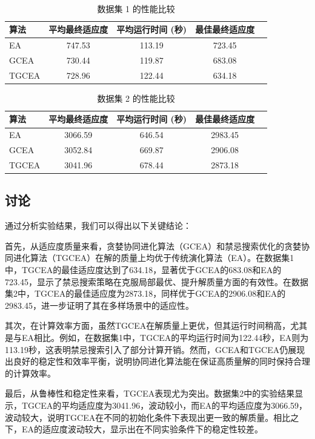 \documentclass[12pt,a4paper,oneside]{ctexart}
\begin{document}
	\newpage\
	\begin{table}[h!]
		\centering
		\caption{数据集 1 的性能比较}
		\begin{tabular}{lcccc}
			\toprule
			\textbf{算法} & \textbf{平均最终适应度} & \textbf{平均运行时间 (秒)} & \textbf{最佳最终适应度} \\
			\midrule
			EA    & 747.53 & 113.19 & 723.45 \\
			GCEA  & 730.44 & 119.87 & 683.08 \\
			TGCEA & 728.96 & 122.44 & 634.18 \\
			\bottomrule
		\end{tabular}
	\end{table}
	
	\begin{table}[h!]
		\centering
		\caption{数据集 2 的性能比较}
		\begin{tabular}{lcccc}
			\toprule
			\textbf{算法} & \textbf{平均最终适应度} & \textbf{平均运行时间 (秒)} & \textbf{最佳最终适应度} \\
			\midrule
			EA    & 3066.59 & 646.54 & 2983.45 \\
			GCEA  & 3052.84 & 669.87 & 2906.08 \\
			TGCEA & 3041.96 & 678.44 & 2873.18 \\
			\bottomrule
		\end{tabular}
	\end{table}

	
\subsection{讨论}

通过分析实验结果，我们可以得出以下关键结论：

首先，从适应度质量来看，贪婪协同进化算法（GCEA）和禁忌搜索优化的贪婪协同进化算法（TGCEA）在解的质量上均优于传统演化算法（EA）。在数据集1中，TGCEA的最佳适应度达到了634.18，显著优于GCEA的683.08和EA的723.45，显示了禁忌搜索策略在克服局部最优、提升解质量方面的有效性。在数据集2中，TGCEA的最佳适应度为2873.18，同样优于GCEA的2906.08和EA的2983.45，进一步证明了其在多样场景中的适应性。

其次，在计算效率方面，虽然TGCEA在解质量上更优，但其运行时间稍高，尤其是与EA相比。例如，在数据集1中，TGCEA的平均运行时间为122.44秒，EA则为113.19秒，这表明禁忌搜索引入了部分计算开销。然而，GCEA和TGCEA仍展现出良好的稳定性和效率平衡，说明协同进化算法能在保证高质量解的同时保持合理的计算效率。

最后，从鲁棒性和稳定性来看，TGCEA表现尤为突出。数据集2中的实验结果显示，TGCEA的平均适应度为3041.96，波动较小，而EA的平均适应度为3066.59，波动较大，说明TGCEA在不同的初始化条件下表现出更一致的解质量。相比之下，EA的适应度波动较大，显示出在不同实验条件下的稳定性较差。
\end{document}
